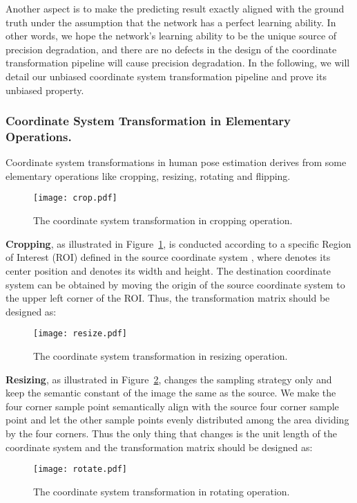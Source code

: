 \documentclass[10pt,journal,compsoc]{IEEEtran}
\begin{document}
Another aspect is to make the predicting result exactly aligned with the ground truth under the assumption that the network has a perfect learning ability. In other words, we hope the network's learning ability to be the unique source of precision degradation, and there are no defects in the design of the coordinate transformation pipeline will cause precision degradation. In the following, we will detail our unbiased coordinate system transformation pipeline and prove its unbiased property.


\subsubsection{Coordinate System Transformation in Elementary Operations.}
Coordinate system transformations in human pose estimation derives from some elementary operations like cropping, resizing, rotating and flipping.

\begin{figure}[h]
    \centering
    \texttt{[image: crop.pdf]}
    \caption{The coordinate system transformation in cropping operation. }
    \label{fig:crop}
\end{figure}

\textbf{Cropping}, as illustrated in Figure~\ref{fig:crop}, is conducted according to a specific Region of Interest (ROI) defined in the source coordinate system , where  denotes its center position and  denotes its width and height. The destination coordinate system can be obtained by moving the origin of the source coordinate system to the upper left corner of the ROI. Thus, the transformation matrix should be designed as:


\begin{figure}[h]
    \centering
    \texttt{[image: resize.pdf]}
    \caption{The coordinate system transformation in resizing operation. }
    \label{fig:resize}
\end{figure}

\textbf{Resizing}, as illustrated in Figure~\ref{fig:resize}, changes the sampling strategy only and keep the semantic constant of the image the same as the source. We make the four corner sample point semantically align with the source four corner sample point and let the other sample points evenly distributed among the area dividing by the four corners. Thus the only thing that changes is the unit length of the coordinate system and the transformation matrix should be designed as:


\begin{figure}[h]
    \centering
    \texttt{[image: rotate.pdf]}
    \caption{The coordinate system transformation in rotating operation. }
    \label{fig:rotate}
\end{figure}
\end{document}
